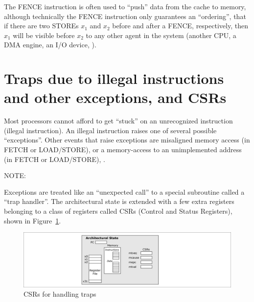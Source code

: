 The FENCE instruction is often used to ``push'' data from the cache to
memory, although technically the FENCE instruction only guarantees an
``ordering'', {\ie} that if there are two STOREs $x_1$ and $x_2$
before and after a FENCE, respectively, then $x_1$ will be visible
before $x_2$ to any other agent in the system (another CPU, a DMA
engine, an I/O device, {\etc}).


\section{Traps due to illegal instructions and other exceptions, and CSRs}

\label{Sec_Traps}

Most processors cannot afford to get ``stuck'' on an unrecognized
instruction (illegal instruction).  An illegal instruction raises one
of several possible ``exceptions''.  Other events that raise
exceptions are misaligned memory access (in FETCH or LOAD/STORE), or a
memory-access to an unimplemented address (in FETCH or LOAD/STORE),
{\etc}.

\vspace{2ex}

NOTE:

\vspace{2ex}

Exceptions are treated like an ``unexpected call'' to a special
subroutine called a ``trap handler''.  The architectural state is
extended with a few extra registers belonging to a class of registers
called CSRs (Control and Status Registers), shown in
Figure~\ref{Fig_Trap_CSRs}.
\begin{figure}[htbp]
  \centerline{\includegraphics[width=6in,angle=0]{Figures/Fig_Trap_CSRs}}
  \caption{\label{Fig_Trap_CSRs} CSRs for handling traps}
\end{figure}

